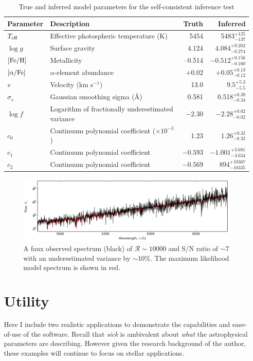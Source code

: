 \documentclass{aastex}
\newcommand{\sick}{\textit{sick}}
\begin{document}
\begin{table}
\caption{True and inferred model parameters for the self-consistent inference test}
\begin{tabular}{llrr}
\hline
\hline
Parameter & Description & Truth & Inferred \\
\hline
$T_{\rm eff}$ & Effective photospheric temperature (K) & 5454 & 5483$_{-137}^{+125}$ \\
$\log{}g$ & Surface gravity & 4.124 & 4.084$_{-0.274}^{+0.262}$ \\
${\rm [Fe/H]}$	& Metallicity & --0.514 & $-0.512_{-0.160}^{+0.156}$ \\
$[\alpha/{\rm Fe}]$ & $\alpha$-element abundance & $+0.02$ & $+0.05_{-0.12}^{+0.13}$ \\
$v$		& Velocity (km s$^{-1}$) & 13.0 & $9.5_{-5.5}^{+5.3}$ \\
$\sigma_s$ & Gaussian smoothing sigma (\AA{}) & 0.581 & 0.518$_{-0.34}^{+0.39}$ \\
$\log{f}$ & Logarithm of fractionally underestimated variance & $-2.30$ & $-2.28_{-0.02}^{+0.02}$ \\
$c_{0}$ & Continuum polynomial coefficient ($\times10^{-3}$) & 1.23 & $1.26_{-0.32}^{+0.32}$ \\
$c_{1}$ & Continuum polynomial coefficient & $-0.593$ & $-1.001_{-3.634}^{+3.681}$ \\
$c_{2}$ & Continuum polynomial coefficient & $-0.569$ & $894_{-10335}^{+10367}$ \\
\hline
\end{tabular}
\end{table}

\begin{figure}
\label{fig:spectrum-inference}
\includegraphics[width=\textwidth]{spectrum.pdf}
\caption{A faux observed spectrum (black) of $\mathcal{R} \sim 10000$ and S/N ratio of $\sim7$ with an underestimated variance by $\sim$10\%. The maximum likelihood model spectrum is shown in red. }
\end{figure}

\section{Utility}
Here I include two realistic applications to demonstrate the capabilities and ease-of-use of the software. Recall that \sick{} is ambivalent about \textit{what} the astrophysical parameters are describing. However given the research background of the author, these examples will continue to focus on stellar applications.
 
\end{document}
